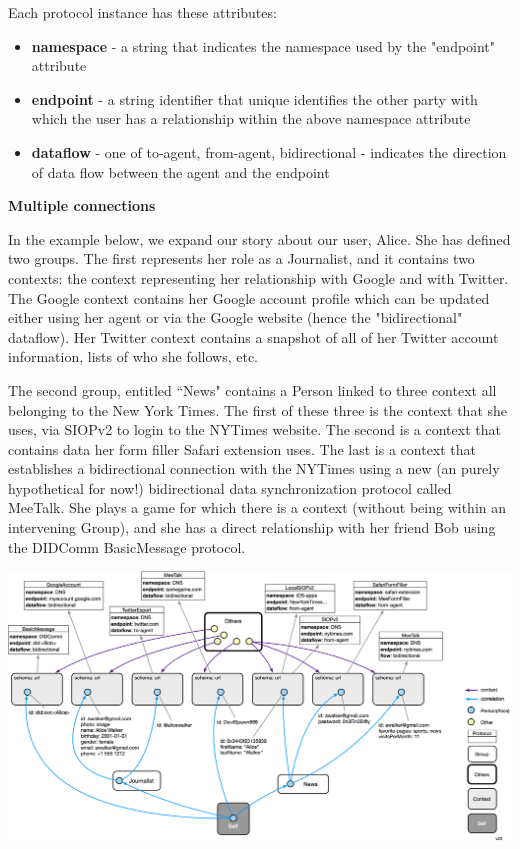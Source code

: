 \documentclass[11pt, oneside]{article}   	%
\begin{document}
Each protocol instance has these attributes:

\begin{itemize}
\item \textbf{namespace} - a string that indicates the namespace used by the "endpoint" attribute
\item \textbf{endpoint} - a string identifier that unique identifies the other party with which the user has a relationship within the above namespace attribute
\item \textbf{dataflow} - one of {to-agent, from-agent, bidirectional} - indicates the direction of data flow between the agent and the endpoint
\end{itemize}

\textbf{Multiple connections}

In the example below, we expand our story about our user, Alice. She has defined two groups. The first represents her role as a Journalist, and it contains two contexts: the context representing her relationship with Google and with Twitter. The Google context contains her Google account profile which can be updated either using her agent or via the Google website (hence the "bidirectional" dataflow). Her Twitter context contains a snapshot of all of her Twitter account information, lists of who she follows, etc. 

The second group, entitled ``News" contains a Person linked to three context all belonging to the New York Times. The first of these three is the context that she uses, via SIOPv2 to login to the NYTimes website. The second is a context that contains data her form filler Safari extension uses. The last is a context that establishes a bidirectional connection with the NYTimes using a new (an purely hypothetical for now!) bidirectional data synchronization protocol called MeeTalk. She plays a game for which there is a context (without being within an intervening Group), and she has a direct relationship with her friend Bob using the DIDComm BasicMessage protocol.  

\includegraphics[width=\textwidth]{./images/multiple-connections.png}
\end{document}
